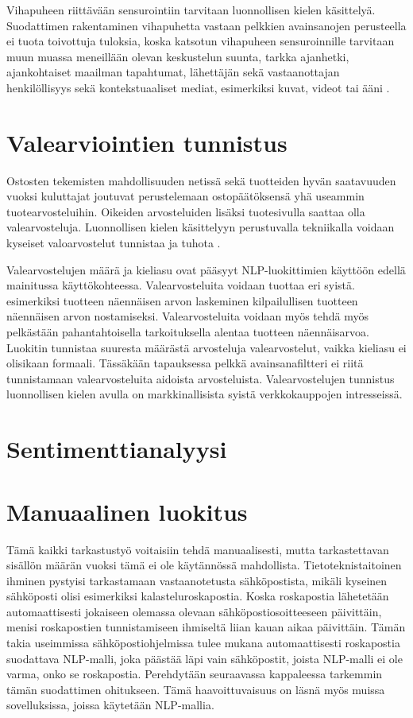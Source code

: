 Vihapuheen riittävään sensurointiin tarvitaan luonnollisen kielen käsittelyä. Suodattimen rakentaminen vihapuhetta vastaan pelkkien avainsanojen perusteella ei tuota toivottuja tuloksia, koska katsotun vihapuheen sensuroinnille tarvitaan muun muassa meneillään olevan keskustelun suunta, tarkka ajanhetki, ajankohtaiset maailman tapahtumat, lähettäjän sekä vastaanottajan henkilöllisyys sekä kontekstuaaliset mediat, esimerkiksi kuvat, videot tai ääni \citep{hate}.

\section{Valearviointien tunnistus}
Ostosten tekemisten mahdollisuuden netissä sekä tuotteiden hyvän saatavuuden vuoksi kuluttajat joutuvat perustelemaan ostopäätöksensä yhä useammin tuotearvosteluihin. Oikeiden arvosteluiden lisäksi tuotesivulla saattaa olla valearvosteluja. Luonnollisen kielen käsittelyyn perustuvalla tekniikalla voidaan kyseiset valoarvostelut tunnistaa ja tuhota \citep{falsereview}.

Valearvostelujen määrä ja kieliasu ovat pääsyyt NLP-luokittimien käyttöön edellä mainitussa käyttökohteessa. Valearvosteluita voidaan tuottaa eri syistä. esimerkiksi tuotteen näennäisen arvon laskeminen kilpailullisen tuotteen näennäisen arvon nostamiseksi.  Valearvosteluita voidaan myös tehdä myös pelkästään pahantahtoisella tarkoituksella alentaa tuotteen näennäisarvoa. Luokitin tunnistaa suuresta määrästä arvosteluja valearvostelut, vaikka kieliasu ei olisikaan formaali. Tässäkään tapauksessa pelkkä avainsanafiltteri ei riitä tunnistamaan valearvosteluita aidoista arvosteluista. Valearvostelujen tunnistus luonnollisen kielen avulla on markkinallisista syistä verkkokauppojen intresseissä.

\section{Sentimenttianalyysi}


\section{Manuaalinen luokitus}

Tämä kaikki tarkastustyö voitaisiin tehdä manuaalisesti, mutta tarkastettavan sisällön määrän vuoksi tämä ei ole käytännössä mahdollista. Tietoteknistaitoinen ihminen pystyisi tarkastamaan vastaanotetusta sähköpostista, mikäli kyseinen sähköposti olisi esimerkiksi kalasteluroskapostia. Koska roskapostia lähetetään automaattisesti jokaiseen olemassa olevaan sähköpostiosoitteeseen päivittäin, menisi roskapostien tunnistamiseen ihmiseltä liian kauan aikaa päivittäin. Tämän takia useimmissa sähköpostiohjelmissa tulee mukana automaattisesti roskapostia suodattava NLP-malli, joka päästää läpi vain sähköpostit, joista NLP-malli ei ole varma, onko se roskapostia. Perehdytään seuraavassa kappaleessa tarkemmin tämän suodattimen ohitukseen. Tämä haavoittuvaisuus on läsnä myös muissa sovelluksissa, joissa käytetään NLP-mallia.